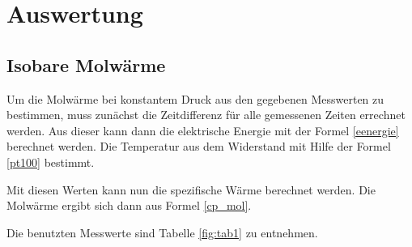 \section{Auswertung}
\subsection{Isobare Molwärme}
Um die Molwärme bei konstantem Druck aus den gegebenen Messwerten zu bestimmen, muss zunächst die Zeitdifferenz für alle gemessenen Zeiten errechnet werden. Aus dieser kann dann die elektrische Energie mit der Formel \eqref{eenergie} berechnet werden. Die Temperatur aus dem Widerstand mit Hilfe der Formel \eqref{pt100} bestimmt.

\noindent Mit diesen Werten kann nun die spezifische Wärme berechnet werden. Die Molwärme ergibt sich dann aus Formel \eqref{cp_mol}.

\noindent Die benutzten Messwerte sind Tabelle \ref{fig:tab1} zu entnehmen.   

